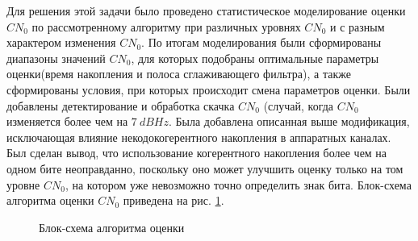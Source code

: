 \documentclass{article}
\begin{document}
Для решения этой задачи было проведено статистическое моделирование оценки $CN_{0}$ по рассмотренному алгоритму при различных уровнях $CN_{0}$ и с разным характером изменения $CN_{0}$. По итогам моделирования были сформированы диапазоны значений $CN_{0}$, для которых подобраны оптимальные параметры оценки(время накопления и полоса сглаживающего фильтра), а также сформированы условия, при которых происходит смена параметров оценки. Были добавлены детектирование и обработка скачка $CN_{0}$ (случай, когда $CN_{0}$ изменяется более чем на $7~dBHz$. Была добавлена описанная выше модификация, исключающая влияние некодокогерентного накопления в аппаратных каналах. Был сделан вывод, что использование когерентного накопления более чем на одном бите неоправданно, поскольку оно может улучшить оценку только на том уровне $CN_{0}$, на котором уже невозможно точно определить знак бита. Блок-схема алгоритма оценки $CN_{0}$ приведена на рис. \ref{scheme}.

\begin{figure}[htb]
    \centering
    \resizebox{1\textwidth}{!}{\unskip}
    \caption{Блок-схема алгоритма оценки} \label{scheme}
\end{figure}
\end{document}
